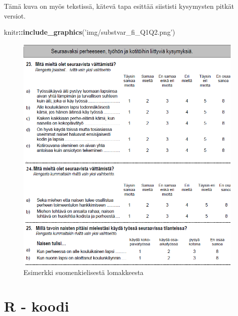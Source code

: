 \documentclass[
  finnish,
]{book}
\newenvironment{Shaded}{\begin{snugshade}}{\end{snugshade}}
\newcommand{\KeywordTok}[1]{\textcolor[rgb]{0.13,0.29,0.53}{\textbf{#1}}}
\newcommand{\NormalTok}[1]{#1}
\newcommand{\OperatorTok}[1]{\textcolor[rgb]{0.81,0.36,0.00}{\textbf{#1}}}
\newcommand{\StringTok}[1]{\textcolor[rgb]{0.31,0.60,0.02}{#1}}
\begin{document}
Tämä kuva on myös tekstissä, kätevä tapa esittää siististi kysymysten pitkät
versiot.

\begin{Shaded}
\begin{Highlighting}[]
\NormalTok{knitr}\OperatorTok{::}\KeywordTok{include_graphics}\NormalTok{(}\StringTok{'img/substvar_fi_Q1Q2.png'}\NormalTok{)}
\end{Highlighting}
\end{Shaded}

\begin{figure}

{\centering \includegraphics[width=0.6\linewidth]{img/substvar_fi_Q1Q2} 

}

\caption{Esimerkki suomenkielisestä lomakkeesta}\label{fig:L1suomlom1}
\end{figure}

\hypertarget{r---koodi}{%
\section{R - koodi}\label{r---koodi}}
\end{document}

